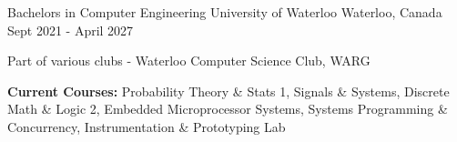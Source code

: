 

\begin{cventries}

  \cventry
    {Bachelors in Computer Engineering} %
    {University of Waterloo} %
    {Waterloo, Canada} %
    {Sept 2021 - April 2027} %
    {
      \begin{cvitems} %
        \item {Part of various clubs - Waterloo Computer Science Club, WARG}
        \item {\textbf{Current Courses:} Probability Theory \& Stats 1, Signals \& Systems, Discrete Math \& Logic 2, Embedded Microprocessor Systems, Systems Programming \& Concurrency, Instrumentation \& Prototyping Lab}
      \end{cvitems}
    }
    
\end{cventries}
